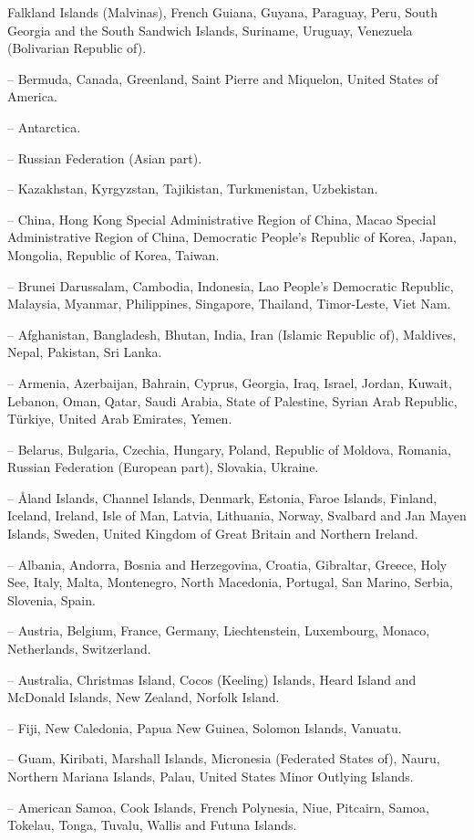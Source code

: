 \begin{description}
          Falkland Islands (Malvinas), French Guiana, Guyana, Paraguay, Peru, South Georgia and the South Sandwich Islands, Suriname,
          Uruguay, Venezuela (Bolivarian Republic of).
	\item[Northern America] -- Bermuda, Canada, Greenland, Saint Pierre and Miquelon, United States of America.
	\item[Antarctica] -- Antarctica.
	\item[Northern Asia] -- Russian Federation (Asian part).
	\item[Central Asia] -- Kazakhstan, Kyrgyzstan, Tajikistan, Turkmenistan, Uzbekistan.
	\item[Eastern Asia] -- China, Hong Kong Special Administrative Region of China, Macao Special Administrative Region of China,
          Democratic People's Republic of Korea, Japan, Mongolia, Republic of Korea, Taiwan.
	\item[South-eastern Asia] -- Brunei Darussalam, Cambodia, Indonesia, Lao People's Democratic Republic, Malaysia, Myanmar,
          Philippines, Singapore, Thailand, Timor-Leste, Viet Nam.
	\item[Southern Asia] -- Afghanistan, Bangladesh, Bhutan, India, Iran (Islamic Republic of), Maldives, Nepal, Pakistan, Sri Lanka.
	\item[Western Asia] -- Armenia, Azerbaijan, Bahrain, Cyprus, Georgia, Iraq, Israel, Jordan, Kuwait, Lebanon, Oman, Qatar,
          Saudi Arabia, State of Palestine, Syrian Arab Republic, Türkiye, United Arab Emirates, Yemen.
	\item[Eastern Europe] -- Belarus, Bulgaria, Czechia, Hungary, Poland, Republic of Moldova, Romania, Russian Federation (European part), Slovakia, Ukraine.
	\item[Northern Europe] -- Åland Islands, Channel Islands, Denmark, Estonia, Faroe Islands, Finland, Iceland, Ireland, Isle of Man, Latvia, Lithuania,
          Norway, Svalbard and Jan Mayen Islands, Sweden, United Kingdom of Great Britain and Northern Ireland.
	\item[Southern Europe] -- Albania, Andorra, Bosnia and Herzegovina, Croatia, Gibraltar, Greece, Holy See, Italy, Malta, Montenegro, North Macedonia, Portugal, San Marino, Serbia, Slovenia, Spain.
	\item[Western Europe] -- Austria, Belgium, France, Germany, Liechtenstein, Luxembourg, Monaco, Netherlands, Switzerland.
	\item[Australasia] -- Australia, Christmas Island, Cocos (Keeling) Islands, Heard Island and McDonald Islands, New Zealand, Norfolk Island.
	\item[Melanesia] -- Fiji, New Caledonia, Papua New Guinea, Solomon Islands, Vanuatu.
	\item[Micronesia] -- Guam, Kiribati, Marshall Islands, Micronesia (Federated States of), Nauru, Northern Mariana Islands, Palau, United States Minor Outlying Islands.
	\item[Polynesia] -- American Samoa, Cook Islands, French Polynesia, Niue, Pitcairn, Samoa, Tokelau, Tonga, Tuvalu, Wallis and Futuna Islands.
\end{description}

